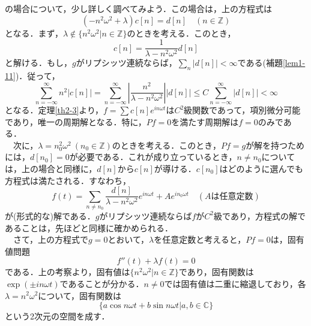 \documentclass[a4j]{jsbook}
\numberwithin{theorem}{chapter}  %
\begin{document}
の場合について，少し詳しく調べてみよう．この場合は，上の方程式は
\begin{equation*}
    (-n^2\omega^2+\lambda)c[n]=d[n]\quad (n\in\mathbb{Z})
\end{equation*}
となる．まず，\(\lambda\notin\{n^2\omega^2|n\in\mathbb{Z}\}\)のときを考える．このとき，
\begin{equation*}
    c[n]=\frac{1}{\lambda-n^2\omega^2}d[n]
\end{equation*}
と解ける．もし，\(g\)がリプシッツ連続ならば，\(\displaystyle\sum_n |d[n]|<\infty\)である(補題\ref{lem1-11})．従って，
\begin{equation*}
    \sum_{n=-\infty}^\infty n^2|c[n]|=\sum_{n=-\infty}^\infty\left|\frac{n^2}{\lambda-n^2\omega^2}\right||d[n]|\leq C\sum_{n=-\infty}^\infty |d[n]|<\infty
\end{equation*}
となる．定理\ref{th2-3}より，\(\displaystyle f=\sum c[n]e^{in\omega t}\)は\(C^2\)級関数であって，項別微分可能であり，唯一の周期解となる．特に，\(Pf=0\)を満たす周期解は\(f=0\)のみである．\\
　次に，\(\lambda=n_0^2\omega^2\ (n_0\in\mathbb{Z})\)のときを考える．このとき，\(Pf=g\)が解を持つためには，\(d[n_0]=0\)が必要である．これが成り立っているとき，\(n\neq n_0\)については，上の場合と同様に，\(d[n]\)から\(c[n]\)が導ける．\(c[n_0]\)はどのように選んでも方程式は満たされる．すなわち，
\begin{equation*}
    f(t)=\sum_{n\neq n_0}\frac{d[n]}{\lambda-n^2\omega^2}e^{in\omega t}+Ae^{in_0\omega t}\quad (A\mbox{は任意定数})
\end{equation*}
が(形式的な)解である．\(g\)がリプシッツ連続ならば\(f\)が\(C^2\)級であり，方程式の解であることは，先ほどと同様に確かめられる．\\
　さて，上の方程式で\(g=0\)とおいて，\(\lambda\)を任意定数と考えると，\(Pf=0\)は，固有値問題
\begin{equation*}
    f''(t)+\lambda f(t)=0
\end{equation*}
である．上の考察より，固有値は\(\{n^2\omega^2|n\in\mathbb{Z}\}\)であり，固有関数は\(\exp(\pm in\omega t)\)であることが分かる．\(n\neq 0\)では固有値は二重に縮退しており，各\(\lambda=n^2\omega^2\)について，固有関数は
\begin{equation*}
    \{a\cos n\omega t+b\sin n\omega t|a, b\in\mathbb{C}\}
\end{equation*}
という2次元の空間を成す．
\end{document}
